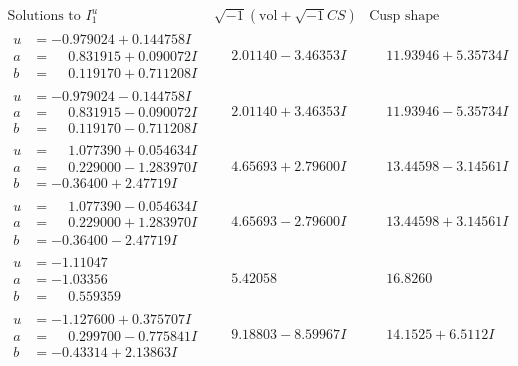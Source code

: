 \documentclass[1p]{elsarticle_modified}
\theoremstyle{definition}
\newcommand{\I}{\sqrt{-1}}
\begin{document}
$$\begin{array}{c|c|c}  
\text{Solutions to }I^u_{1}& \I (\text{vol} + \sqrt{-1}CS) & \text{Cusp shape}\\
 \hline 
\begin{aligned}
u &= -0.979024 + 0.144758 I \\
a &= \phantom{-}0.831915 + 0.090072 I \\
b &= \phantom{-}0.119170 + 0.711208 I\end{aligned}
 & \phantom{-}2.01140 - 3.46353 I & \phantom{-}11.93946 + 5.35734 I \\ \hline\begin{aligned}
u &= -0.979024 - 0.144758 I \\
a &= \phantom{-}0.831915 - 0.090072 I \\
b &= \phantom{-}0.119170 - 0.711208 I\end{aligned}
 & \phantom{-}2.01140 + 3.46353 I & \phantom{-}11.93946 - 5.35734 I \\ \hline\begin{aligned}
u &= \phantom{-}1.077390 + 0.054634 I \\
a &= \phantom{-}0.229000 - 1.283970 I \\
b &= -0.36400 + 2.47719 I\end{aligned}
 & \phantom{-}4.65693 + 2.79600 I & \phantom{-}13.44598 - 3.14561 I \\ \hline\begin{aligned}
u &= \phantom{-}1.077390 - 0.054634 I \\
a &= \phantom{-}0.229000 + 1.283970 I \\
b &= -0.36400 - 2.47719 I\end{aligned}
 & \phantom{-}4.65693 - 2.79600 I & \phantom{-}13.44598 + 3.14561 I \\ \hline\begin{aligned}
u &= -1.11047\phantom{ +0.000000I} \\
a &= -1.03356\phantom{ +0.000000I} \\
b &= \phantom{-}0.559359\phantom{ +0.000000I}\end{aligned}
 & \phantom{-}5.42058\phantom{ +0.000000I} & \phantom{-}16.8260\phantom{ +0.000000I} \\ \hline\begin{aligned}
u &= -1.127600 + 0.375707 I \\
a &= \phantom{-}0.299700 - 0.775841 I \\
b &= -0.43314 + 2.13863 I\end{aligned}
 & \phantom{-}9.18803 - 8.59967 I & \phantom{-}14.1525 + 6.5112 I \\ \hline\begin{aligned}

\end{aligned}
\end{array}$$
\end{document}
